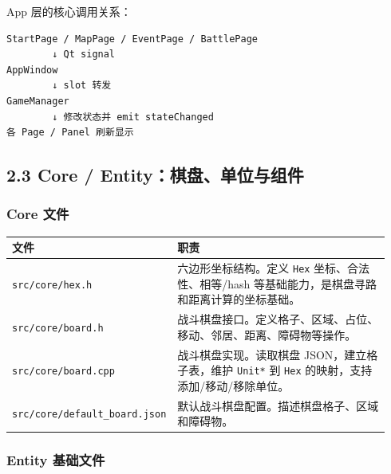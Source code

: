 \documentclass[UTF8,10pt]{ctexart}
\begin{document}
App 层的核心调用关系：

\begin{lstlisting}
StartPage / MapPage / EventPage / BattlePage
        ↓ Qt signal
AppWindow
        ↓ slot 转发
GameManager
        ↓ 修改状态并 emit stateChanged
各 Page / Panel 刷新显示
\end{lstlisting}

\subsection*{2.3 Core / Entity：棋盘、单位与组件}

\subsubsection*{Core 文件}

{\small
\begin{longtable}{p{0.34\linewidth}p{0.60\linewidth}}
\toprule
\textbf{文件} & \textbf{职责} \\
\midrule
\texttt{src/\allowbreak{}core/\allowbreak{}hex.\allowbreak{}h} & 六边形坐标结构。定义 \texttt{Hex} 坐标、合法性、相等/hash 等基础能力，是棋盘寻路和距离计算的坐标基础。 \\
\texttt{src/\allowbreak{}core/\allowbreak{}board.\allowbreak{}h} & 战斗棋盘接口。定义格子、区域、占位、移动、邻居、距离、障碍物等操作。 \\
\texttt{src/\allowbreak{}core/\allowbreak{}board.\allowbreak{}cpp} & 战斗棋盘实现。读取棋盘 JSON，建立格子表，维护 \texttt{Unit*} 到 \texttt{Hex} 的映射，支持添加/移动/移除单位。 \\
\texttt{src/\allowbreak{}core/\allowbreak{}default\_\allowbreak{}board.\allowbreak{}json} & 默认战斗棋盘配置。描述棋盘格子、区域和障碍物。 \\
\bottomrule
\end{longtable}
}

\subsubsection*{Entity 基础文件}
\end{document}
